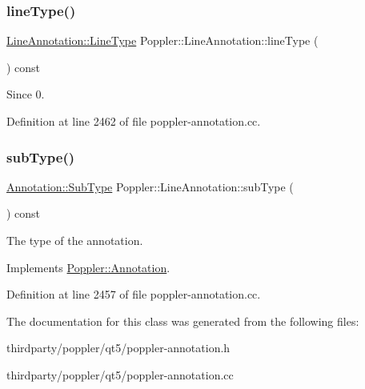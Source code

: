 \subsubsection{\texorpdfstring{line\+Type()}{lineType()}}
{\footnotesize\ttfamily \hyperlink{class_poppler_1_1_line_annotation_a0bcd4ea8f032803eb08e0411f78e0304}{Line\+Annotation\+::\+Line\+Type} Poppler\+::\+Line\+Annotation\+::line\+Type (\begin{DoxyParamCaption}{ }\end{DoxyParamCaption}) const}

\begin{DoxySince}{Since}
0. 
\end{DoxySince}


Definition at line 2462 of file poppler-\/annotation.\+cc.

\mbox{\label{class_poppler_1_1_line_annotation_aa6afc935d75cfdac20653814b0fe40f0}} 
\subsubsection{\texorpdfstring{sub\+Type()}{subType()}}
{\footnotesize\ttfamily \hyperlink{class_poppler_1_1_annotation_a2d592999c330949d64679cfa9e81113f}{Annotation\+::\+Sub\+Type} Poppler\+::\+Line\+Annotation\+::sub\+Type (\begin{DoxyParamCaption}{ }\end{DoxyParamCaption}) const\hspace{0.3cm}{\ttfamily [virtual]}}

The type of the annotation. 

Implements \hyperlink{class_poppler_1_1_annotation_aef7fa1532193b41fbeba6e577579d984}{Poppler\+::\+Annotation}.



Definition at line 2457 of file poppler-\/annotation.\+cc.



The documentation for this class was generated from the following files\+:\begin{DoxyCompactItemize}
\item 
thirdparty/poppler/qt5/poppler-\/annotation.\+h\item 
thirdparty/poppler/qt5/poppler-\/annotation.\+cc\end{DoxyCompactItemize}
